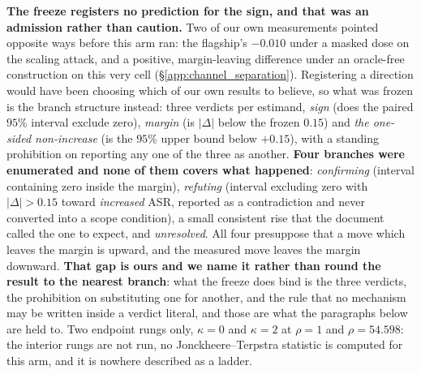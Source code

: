 \documentclass{article}
\begin{document}
\textbf{The freeze registers no prediction for the sign, and that was an admission rather than caution.} Two of our own measurements pointed opposite ways before this arm ran: the flagship's $-0.010$ under a masked dose on the scaling attack, and a positive, margin-leaving difference under an oracle-free construction on this very cell (§\ref{app:channel_separation}). Registering a direction would have been choosing which of our own results to believe, so what was frozen is the branch structure instead: three verdicts per estimand, \emph{sign} (does the paired $95\%$ interval exclude zero), \emph{margin} (is $|\Delta|$ below the frozen $0.15$) and \emph{the one-sided non-increase} (is the $95\%$ upper bound below $+0.15$), with a standing prohibition on reporting any one of the three as another. \textbf{Four branches were enumerated and none of them covers what happened}: \emph{confirming} (interval containing zero inside the margin), \emph{refuting} (interval excluding zero with $|\Delta| > 0.15$ toward \emph{increased} ASR, reported as a contradiction and never converted into a scope condition), a small consistent rise that the document called the one to expect, and \emph{unresolved}. All four presuppose that a move which leaves the margin is upward, and the measured move leaves the margin downward. \textbf{That gap is ours and we name it rather than round the result to the nearest branch}: what the freeze does bind is the three verdicts, the prohibition on substituting one for another, and the rule that no mechanism may be written inside a verdict literal, and those are what the paragraphs below are held to. Two endpoint rungs only, $\kappa{=}0$ and $\kappa{=}2$ at $\rho{=}1$ and $\rho{=}54.598$: the interior rungs are not run, no Jonckheere--Terpstra statistic is computed for this arm, and it is nowhere described as a ladder.
\end{document}
